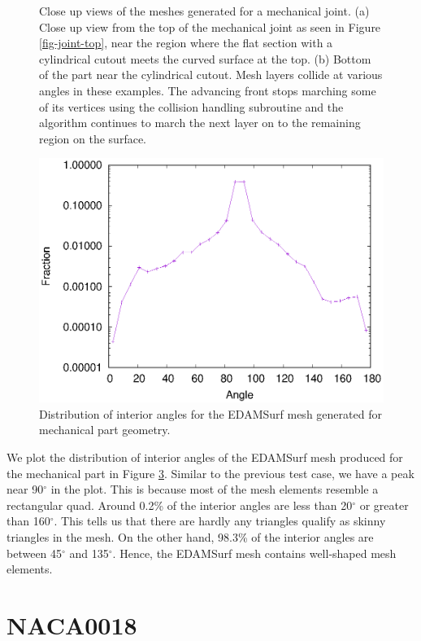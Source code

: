 \begin{figure}
\begin{subfigure}{.5\textwidth}
		\caption{}
		\label{closeUp2}
	\end{subfigure}
	\caption[Close up views of the meshes generated for a mechanical joint.]{Close up views of the meshes generated for a mechanical joint. (a) Close up view from the top of the mechanical joint as seen in Figure \ref{fig-joint-top}, near the region where the flat section with a cylindrical cutout meets the curved surface at the top. (b) Bottom of the part near the cylindrical cutout. Mesh layers collide at various angles in these examples. The advancing front stops marching some of its vertices using the collision handling subroutine and the algorithm continues to march the next layer on to the remaining region on the surface.}
	\label{fig-closeUp}
\end{figure}
\begin{figure}
	\centering
	\includegraphics[width=0.5\linewidth]{img/r/joint-x0.004-g1.04-a5/jointSurfMesh.eps}
	\caption{Distribution of interior angles for the EDAMSurf mesh generated for mechanical part geometry.}
	\label{qualityJoint}
\end{figure}

We plot the distribution of interior angles of the EDAMSurf mesh produced for the mechanical part in Figure \ref{qualityJoint}. Similar to the previous test case, we have a peak near 90$^\circ$ in the plot. This is because most of the mesh elements resemble a rectangular quad. Around 0.2\% of the interior angles are less than 20$^\circ$ or greater than 160$^\circ$. This tells us that there are hardly any triangles qualify as skinny triangles in the mesh. On the other hand, 98.3\% of the interior angles are between 45$^\circ$ and 135$^\circ$. Hence, the EDAMSurf mesh contains well-shaped mesh elements.

\section{NACA0018}

